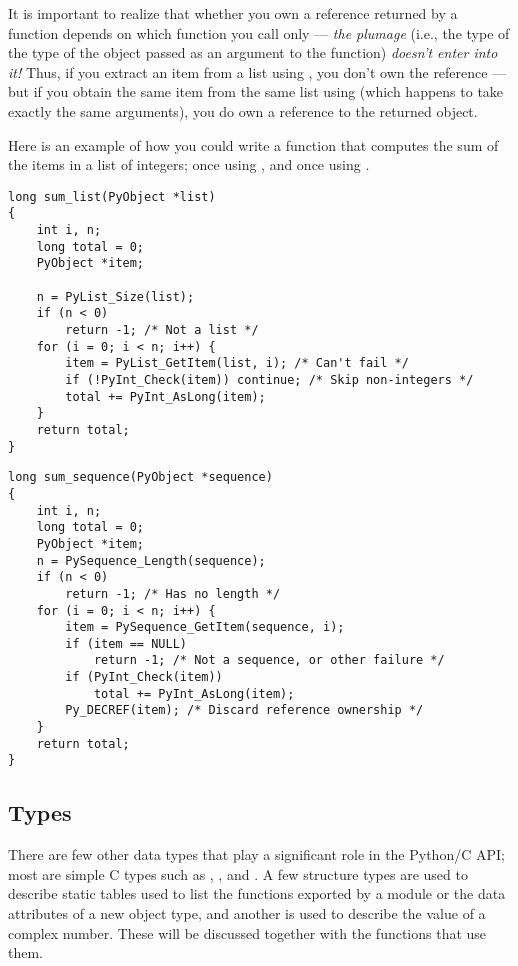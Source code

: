 \documentclass{manual}
\begin{document}
It is important to realize that whether you own a reference returned 
by a function depends on which function you call only --- \emph{the
plumage} (i.e., the type of the type of the object passed as an
argument to the function) \emph{doesn't enter into it!}  Thus, if you 
extract an item from a list using , you
don't own the reference --- but if you obtain the same item from the
same list using  (which happens to
take exactly the same arguments), you do own a reference to the
returned object.

Here is an example of how you could write a function that computes the
sum of the items in a list of integers; once using 
, and once using
.

\begin{verbatim}
long sum_list(PyObject *list)
{
    int i, n;
    long total = 0;
    PyObject *item;

    n = PyList_Size(list);
    if (n < 0)
        return -1; /* Not a list */
    for (i = 0; i < n; i++) {
        item = PyList_GetItem(list, i); /* Can't fail */
        if (!PyInt_Check(item)) continue; /* Skip non-integers */
        total += PyInt_AsLong(item);
    }
    return total;
}
\end{verbatim}

\begin{verbatim}
long sum_sequence(PyObject *sequence)
{
    int i, n;
    long total = 0;
    PyObject *item;
    n = PySequence_Length(sequence);
    if (n < 0)
        return -1; /* Has no length */
    for (i = 0; i < n; i++) {
        item = PySequence_GetItem(sequence, i);
        if (item == NULL)
            return -1; /* Not a sequence, or other failure */
        if (PyInt_Check(item))
            total += PyInt_AsLong(item);
        Py_DECREF(item); /* Discard reference ownership */
    }
    return total;
}
\end{verbatim}


\subsection{Types \label{types}}

There are few other data types that play a significant role in 
the Python/C API; most are simple C types such as , 
,  and .  A few structure types 
are used to describe static tables used to list the functions exported 
by a module or the data attributes of a new object type, and another
is used to describe the value of a complex number.  These will 
be discussed together with the functions that use them.
\end{document}

